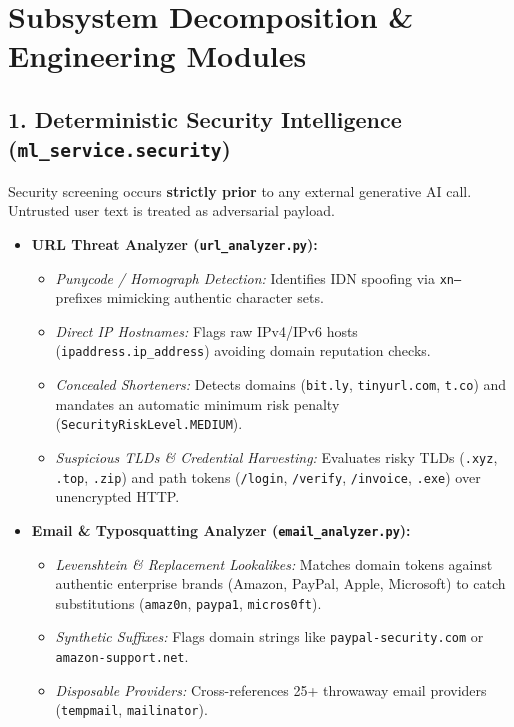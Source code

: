 \documentclass[11pt,a4paper]{article}
\begin{document}
\section{Subsystem Decomposition \& Engineering Modules}

\subsection{1. Deterministic Security Intelligence (\texttt{ml\_service.security})}
Security screening occurs \textbf{strictly prior} to any external generative AI call. Untrusted user text is treated as adversarial payload.
\begin{itemize}[leftmargin=*]
    \item \textbf{URL Threat Analyzer (\texttt{url\_analyzer.py}):}
    \begin{itemize}
        \item \textit{Punycode / Homograph Detection:} Identifies IDN spoofing via \texttt{xn--} prefixes mimicking authentic character sets.
        \item \textit{Direct IP Hostnames:} Flags raw IPv4/IPv6 hosts (\texttt{ipaddress.ip\_address}) avoiding domain reputation checks.
        \item \textit{Concealed Shorteners:} Detects domains (\texttt{bit.ly}, \texttt{tinyurl.com}, \texttt{t.co}) and mandates an automatic minimum risk penalty (\texttt{SecurityRiskLevel.MEDIUM}).
        \item \textit{Suspicious TLDs \& Credential Harvesting:} Evaluates risky TLDs (\texttt{.xyz}, \texttt{.top}, \texttt{.zip}) and path tokens (\texttt{/login}, \texttt{/verify}, \texttt{/invoice}, \texttt{.exe}) over unencrypted HTTP.
    \end{itemize}
    \item \textbf{Email \& Typosquatting Analyzer (\texttt{email\_analyzer.py}):}
    \begin{itemize}
        \item \textit{Levenshtein \& Replacement Lookalikes:} Matches domain tokens against authentic enterprise brands (Amazon, PayPal, Apple, Microsoft) to catch substitutions (\texttt{amaz0n}, \texttt{paypa1}, \texttt{micros0ft}).
        \item \textit{Synthetic Suffixes:} Flags domain strings like \texttt{paypal-security.com} or \texttt{amazon-support.net}.
        \item \textit{Disposable Providers:} Cross-references 25+ throwaway email providers (\texttt{tempmail}, \texttt{mailinator}).
    \end{itemize}
\end{itemize}
\end{document}
